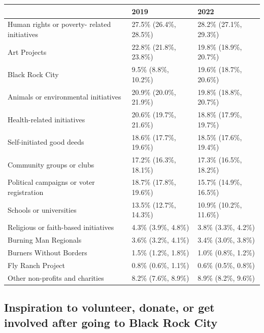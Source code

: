 \documentclass[
]{book}
\begin{document}
\begin{table}
\centering
\begin{tabular}[t]{>{}l|>{}l|>{}l}
\hline
  & 2019 & 2022\\
\hline
Human rights or poverty-
 related initiatives & 27.5\% (26.4\%, 28.5\%) & 28.2\% (27.1\%, 29.3\%)\\
\hline
Art Projects & 22.8\% (21.8\%, 23.8\%) & 19.8\% (18.9\%, 20.7\%)\\
\hline
Black Rock City & 9.5\% (8.8\%, 10.2\%) & 19.6\% (18.7\%, 20.6\%)\\
\hline
Animals or environmental 
 initiatives & 20.9\% (20.0\%, 21.9\%) & 19.8\% (18.8\%, 20.7\%)\\
\hline
Health-related initiatives & 20.6\% (19.7\%, 21.6\%) & 18.8\% (17.9\%, 19.7\%)\\
\hline
Self-initiated good deeds & 18.6\% (17.7\%, 19.6\%) & 18.5\% (17.6\%, 19.4\%)\\
\hline
Community groups or clubs & 17.2\% (16.3\%, 18.1\%) & 17.3\% (16.5\%, 18.2\%)\\
\hline
Political campaigns or 
 voter registration & 18.7\% (17.8\%, 19.6\%) & 15.7\% (14.9\%, 16.5\%)\\
\hline
Schools or universities & 13.5\% (12.7\%, 14.3\%) & 10.9\% (10.2\%, 11.6\%)\\
\hline
Religious or faith-based 
 initiatives & 4.3\% (3.9\%, 4.8\%) & 3.8\% (3.3\%, 4.2\%)\\
\hline
Burning Man Regionals & 3.6\% (3.2\%, 4.1\%) & 3.4\% (3.0\%, 3.8\%)\\
\hline
Burners Without Borders & 1.5\% (1.2\%, 1.8\%) & 1.0\% (0.8\%, 1.2\%)\\
\hline
Fly Ranch Project & 0.8\% (0.6\%, 1.1\%) & 0.6\% (0.5\%, 0.8\%)\\
\hline
Other non-profits and 
 charities & 8.2\% (7.6\%, 8.9\%) & 8.9\% (8.2\%, 9.6\%)\\
\hline
\end{tabular}
\end{table}

\hypertarget{inspiration-to-volunteer-donate-or-get-involved-after-going-to-black-rock-city}{%
\subsection{Inspiration to volunteer, donate, or get involved after going to Black Rock City}\label{inspiration-to-volunteer-donate-or-get-involved-after-going-to-black-rock-city}}
\end{document}
